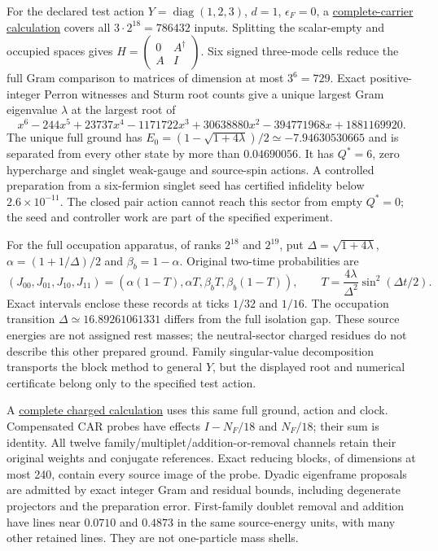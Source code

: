 For the declared test action $Y=\operatorname{diag}(1,2,3)$,
$d=1$, $\epsilon_F=0$, a
\href{https://github.com/FloatingPragma/observer-patch-holography/blob/main/model/particle_scalar_ground/PROOF.md}{complete-carrier calculation}
covers all $3\cdot2^{18}=786432$ inputs. Splitting the scalar-empty
and occupied spaces gives $H=\left(\begin{smallmatrix}0&A^\dagger\\A&I\end{smallmatrix}\right)$.
Six signed three-mode cells reduce the full Gram comparison to matrices
of dimension at most $3^6=729$. Exact positive-integer Perron witnesses
and Sturm root counts give a unique largest Gram eigenvalue $\lambda$
at the largest root of
\[
 x^6-244x^5+23737x^4-1171722x^3+30638880x^2
       -394771968x+1881169920.
\]
The unique full ground has
$E_0=(1-\sqrt{1+4\lambda})/2\simeq-7.94630530665$ and
is separated from every other state by more than $0.04690056$.
It has $Q^*=6$, zero hypercharge and singlet weak-gauge and source-spin
actions. A controlled preparation from a six-fermion singlet seed has
certified infidelity below $2.6\times10^{-11}$. The closed pair action
cannot reach this sector from empty $Q^*=0$; the seed and controller work
are part of the specified experiment.

For the full occupation apparatus, of ranks $2^{18}$ and $2^{19}$,
put $\Delta=\sqrt{1+4\lambda}$, $\alpha=(1+1/\Delta)/2$ and
$\beta_b=1-\alpha$. Original two-time probabilities are
\[
 (J_{00},J_{01},J_{10},J_{11})=
 (\alpha(1-T),\alpha T,\beta_bT,\beta_b(1-T)),\qquad
 T=\frac{4\lambda}{\Delta^2}\sin^2(\Delta t/2).
\]
Exact intervals enclose these records at ticks $1/32$ and $1/16$.
The occupation transition $\Delta\simeq16.89261061331$ differs from
the full isolation gap. These source energies are not assigned rest
masses; the neutral-sector charged residues do not describe this other
prepared ground. Family singular-value decomposition transports the
block method to general $Y$, but the displayed root and numerical
certificate belong only to the specified test action.

A \href{https://github.com/FloatingPragma/observer-patch-holography/blob/main/model/particle_ground_charged/PROOF.md}{complete charged calculation}
uses this same full ground, action and clock. Compensated CAR probes have
effects $I-N_F/18$ and $N_F/18$; their sum is identity. All twelve
family/multiplet/addition-or-removal channels retain their original
weights and conjugate references. Exact reducing blocks, of dimensions
at most 240, contain every source image of the probe. Dyadic eigenframe
proposals are admitted by exact integer Gram and residual bounds,
including degenerate projectors and the preparation error. First-family
doublet removal and addition have lines near $0.0710$ and $0.4873$
in the same source-energy units, with many other retained lines.
They are not one-particle mass shells.

